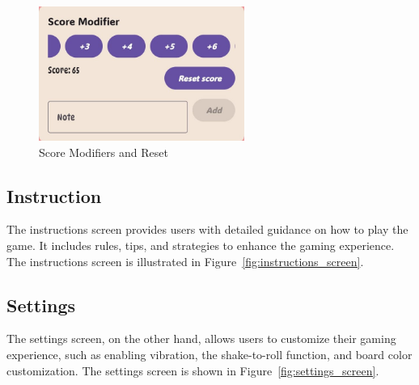 \begin{figure}[ht!]
    \centering
    \includegraphics[width=0.6\textwidth]{img/control7.jpg}
    \caption{Score Modifiers and Reset}
     \label{fig:control7}
\end{figure}

\subsection{Instruction}

The instructions screen provides users with detailed guidance on how to play the game. It includes rules, tips, and strategies to enhance the gaming experience. The instructions screen is illustrated in Figure~\ref{fig:instructions_screen}.

\subsection{Settings}
The settings screen, on the other hand, allows users to customize their gaming experience, such as enabling vibration, the shake-to-roll function, and board color customization. The settings screen is shown in Figure~\ref{fig:settings_screen}.

